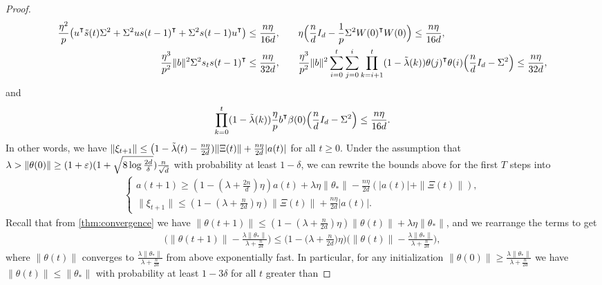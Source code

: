 \begin{proof}
    \begin{align*}
        \frac{\eta^2}{p}\big(u\transpose \tilde{s}(t) \Sigma^2 + \Sigma^2 u s(t-1)\transpose + \Sigma^2 s(t-1)u\transpose\big) \leq \frac{n\eta}{16d},& \qquad \eta\Big(\frac{n}{d}I_d - \frac{1}{p}\Sigma^2 W(0)\transpose W(0)\Big) \leq \frac{n\eta}{16d}, \\
        \frac{\eta^3}{p^2}\|b\|^2 \Sigma^2 s_{t}s(t-1)\transpose \leq \frac{n\eta}{32d},& \qquad \frac{\eta^3}{p^2}\|b\|^2\sum_{i=0}^t\sum_{j=0}^i\prod_{k=i+1}^t(1-\tilde\lambda(k))\theta(j)\transpose \theta(i) \Big(\frac{n}{d}I_d-\Sigma^2\Big) \leq \frac{n\eta}{32d},
    \end{align*}
    and 
    \begin{align*}
        \prod_{k=0}^t (1-\tilde\lambda(k))\frac{\eta}{p}b\transpose\beta(0) \Big(\frac{n}{d}I_d - \Sigma^2\Big) \leq \frac{n\eta}{16d}.
    \end{align*}
    In other words, we have $\|\xi_{t+1}\| \leq \big(1-\tilde{\lambda}(t) - \frac{n\eta}{2d})\|\Xi(t)\| + \frac{n\eta}{2d}|a(t)|$ for all $t\geq 0$. Under the assumption that $\lambda > \|\theta(0)\|\geq (1+\varepsilon)(1 + \sqrt{8\log\frac{2d}{\delta}}) \frac{n}{\sqrt{d}}$ with probability at least $1-\delta$, we can rewrite the bounds above for the first $T$ steps into
    \begin{align*}
        \begin{cases}
            a(t+1)\geq (1-(\lambda+\frac{2n}{d})\eta)a(t)+\lambda\eta\|\theta_*\| - \frac{n\eta}{2d} (|a(t)| + \|\Xi(t)\|), \\
            \|\xi_{t+1}\| \leq (1-(\lambda+\frac{n}{2d})\eta)\|\Xi(t)\| + \frac{n\eta}{2d} |a(t)|.
        \end{cases}
    \end{align*}
    Recall that from \cref{thm:convergence} we have $\|\theta(t+1)\| \leq (1-(\lambda + \frac{n}{2d})\eta )\|\theta(t)\| + \lambda\eta\|\theta_\ast\|$, and we rearrange the terms to get
    \begin{align*}
        \Big(\|\theta(t+1)\| - \frac{\lambda\|\theta_*\|}{\lambda + \frac{n}{2d}}\Big) \leq \Big(1-\Big(\lambda + \frac{n}{2d}\Big)\eta \Big) \Big(\|\theta(t)\|  - \frac{\lambda\|\theta_*\|}{\lambda + \frac{n}{2d}}\Big),
    \end{align*}
    where $\|\theta(t)\|$ converges to $\frac{\lambda\|\theta_*\|}{\lambda + \frac{n}{2d}}$ from above exponentially fast. 
    In particular, for any initialization $\|\theta(0)\| \geq \frac{\lambda\|\theta_*\|}{\lambda + \frac{n}{2d}}$ we have $\|\theta(t)\|\leq \|\theta_*\|$ with probability at least $1-3\delta$ for all $t$ greater than

\end{proof}
